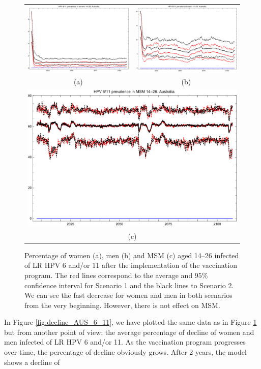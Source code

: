 \begin{figure}[!]
	\centering
	\begin{tabular}{cc}
		\includegraphics[width=0.5\linewidth]{IMGs/3.-Australia/Retr_muj_14_26_verr_Australia.pdf}	& 
		\includegraphics[width=0.5\linewidth]{IMGs/3.-Australia/Retr_hom_14_26_verr_Australia.pdf}  \\ 
		(a)	& (b) \\ 
		\multicolumn{2}{c}{ \includegraphics[width=0.5\linewidth]{IMGs/3.-Australia/Retr_MSM_14_26_verr_Australia.pdf} } \\ 
		\multicolumn{2}{c}{(c)} \\ 
	\end{tabular} 
	\caption{Percentage of women (a), men (b) and MSM (c) aged 14–26 infected of LR HPV 6 and/or 11 after the implementation of the vaccination program. The red lines correspond to the average and $95\%$ confidence interval for Scenario 1 and the black lines to Scenario 2.  We can see the fast decrease for women and men in both scenarios from the very beginning. However, there is not effect on MSM.}
	\label{fig:prev_AUS_6_11}	
\end{figure}

In Figure \ref{fig:decline_AUS_6_11}, we have plotted the same data as in Figure \ref{fig:prev_AUS_6_11} but from another point of view: the average percentage of decline of women and men infected of LR HPV 6 and/or 11. As the vaccination program progresses over time, the percentage of decline obviously grows. After 2 years, the model shows a decline of

